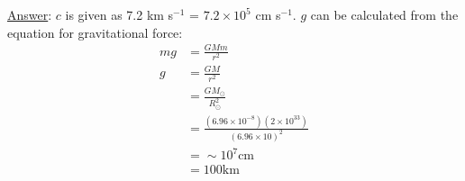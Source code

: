 \documentclass[12pt]{article}
\begin{document}
\begin{enumerate}
        {\small\underline{Answer}: $c$ is given as 7.2 km s$^{-1}$ =
            $7.2\times10^{5}$ cm s$^{-1}$.
            $g$ can be calculated from the equation for gravitational
            force:
            \begin{align*}
                mg &= \frac{GMm}{r^{2}}\\
                 g &= \frac{GM}{r^{2}}\\
                   &= \frac{GM_{\odot}}{R_{\odot}^{2}}\\
                   &= \frac{(6.96\times10^{-8})(2\times10^{33})}
                       {{(6.96\times10)}^{2}}\\
                   &= \sim 10^{7} \textrm{cm}\\
                   &= 100 \textrm{km}\\
            \end{align*}
        }
\end{enumerate}


\end{document}
